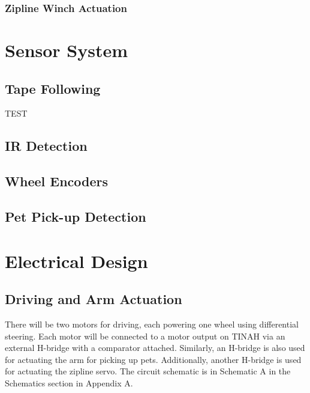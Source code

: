 \documentclass[11pt, oneside]{article} %
\begin{document}
		\subsubsection{Zipline Winch Actuation}



\section{Sensor System}
	
	\subsection{Tape Following}
	
	TEST
	
	\subsection{IR Detection}
	
	\subsection{Wheel Encoders}
	
	\subsection{Pet Pick-up Detection}
	

\section{Electrical Design}

	\subsection{Driving and Arm Actuation}
	
	There will be two motors for driving, each powering one wheel using differential steering. Each motor will be connected to a motor output on TINAH via an external H-bridge with a comparator attached. Similarly, an H-bridge is also used for actuating the arm for picking up pets. Additionally, another H-bridge is used for actuating the zipline servo. The circuit schematic is in Schematic A in the Schematics section in Appendix A.
	
\end{document}
